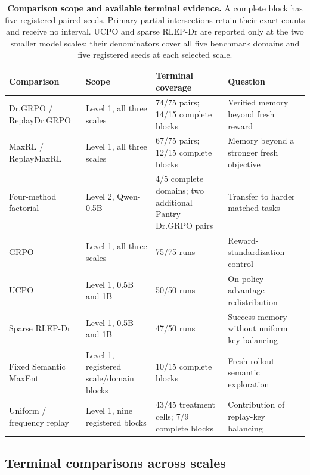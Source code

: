 \documentclass{article}
\newcommand{\1}{\mathbf 1}
\theoremstyle{remark}
\theoremstyle{definition}
\theoremstyle{plain}
\begin{document}
\begin{table}[H]
  \centering
  \caption{\textbf{Comparison scope and available terminal evidence.}
  A complete block has five registered paired seeds. Primary partial
  intersections retain their exact counts and receive no interval.
  UCPO and sparse RLEP-Dr are reported only at the two smaller model scales;
  their denominators cover all five benchmark domains and five registered
  seeds at each selected scale.}
  \label{tab:experiment-map}
  \label{tab:direct-comparators}
  \scriptsize
  \setlength{\tabcolsep}{3pt}
  \begin{tabularx}{\linewidth}{@{}P{.24\linewidth}P{.20\linewidth}P{.22\linewidth}Y@{}}
    \toprule
    \textbf{Comparison} & \textbf{Scope} & \textbf{Terminal coverage}
      & \textbf{Question} \\
    \midrule
    Dr.GRPO / ReplayDr.GRPO & Level 1, all three scales &
      74/75 pairs; 14/15 complete blocks & Verified memory beyond fresh reward \\
    MaxRL / ReplayMaxRL & Level 1, all three scales &
      67/75 pairs; 12/15 complete blocks & Memory beyond a stronger fresh objective \\
    Four-method factorial & Level 2, Qwen-0.5B &
      4/5 complete domains; two additional Pantry Dr.GRPO pairs & Transfer to harder matched tasks \\
    GRPO & Level 1, all three scales &
      75/75 runs & Reward-standardization control \\
    UCPO & Level 1, 0.5B and 1B &
      50/50 runs & On-policy advantage redistribution \\
    Sparse RLEP-Dr & Level 1, 0.5B and 1B &
      47/50 runs & Success memory without uniform key balancing \\
    Fixed Semantic MaxEnt & Level 1, registered scale/domain blocks &
      10/15 complete blocks & Fresh-rollout semantic exploration \\
    Uniform / frequency replay & Level 1, nine registered blocks &
      43/45 treatment cells; 7/9 complete blocks & Contribution of replay-key balancing \\
    \bottomrule
  \end{tabularx}
\end{table}

\subsection{Terminal comparisons across scales}
\label{app:scale-matrix}
\label{app:scale-snapshot}
\label{app:maxrl-scale-extensions}
\label{app:current-campaign-results}
\end{document}
